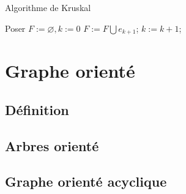 \begin{algorithm}
	\caption{Algorithme de Kruskal}\label{euclid}
	\begin{algorithmic}[1]
		\Procedure{}{}
		\State Poser $ F := \varnothing, k := 0 $
		\State$ F := F \bigcup {e_{k+1} } $;
		\EndIf 
		\State $k := k + 1 $;
		\EndWhile
		\EndProcedure
	\end{algorithmic}
\end{algorithm}

\section{Graphe orienté}
\subsection{Définition}

\subsection{Arbres orienté}

\subsection{Graphe orienté acyclique}


